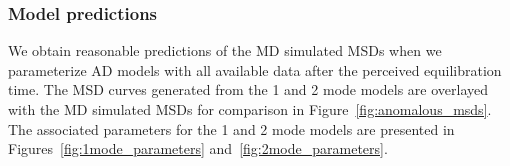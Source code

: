 \documentclass[aps,pre,preprint,groupedaddress,longbibliography]{revtex4-2}
\begin{document}
  \subsubsection{Model predictions}\label{section:AD_all_data}
 
  We obtain reasonable predictions of the MD simulated MSDs when we parameterize AD 
  models with all available data after the perceived equilibration time.  
  The MSD curves generated from the 1 and 2 mode models are overlayed with the MD 
  simulated MSDs for comparison in Figure~\ref{fig:anomalous_msds}. The associated 
  parameters for the 1 and 2 mode models are presented in Figures~\ref{fig:1mode_parameters}
  and~\ref{fig:2mode_parameters}.
  
\end{document}
